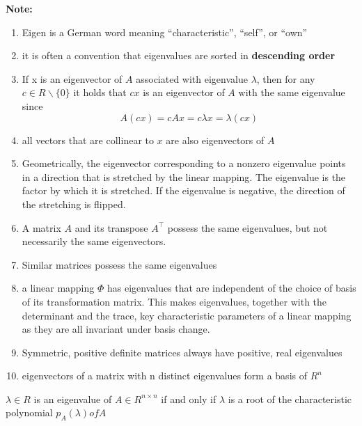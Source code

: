 \noindent\textbf{Note:}
\begin{enumerate}
    \item Eigen is a German word meaning “characteristic”, “self”, or “own”

    \item it is often a convention that eigenvalues are sorted in \textbf{descending order}

    \item If x is an eigenvector of $A$ associated with eigenvalue $\lambda$, then for any $c \in  R\backslash \{0\}$ it holds that $cx$ is an eigenvector of $A$ with the same eigenvalue since 
    \[
        A(cx) = cAx = c\lambda x = \lambda (cx)
    \]

    \item all vectors that are collinear to $x$ are also eigenvectors of $A$

    \item Geometrically, the eigenvector corresponding to a nonzero eigenvalue points in a direction that is stretched by the linear mapping. The eigenvalue is the factor by which it is stretched. If the eigenvalue is negative, the direction of the stretching is flipped.

    \item A matrix $A$ and its transpose $A^\top$  possess the same eigenvalues, but not necessarily the same eigenvectors.

    \item Similar matrices possess the same eigenvalues

    \item a linear mapping $\Phi$ has eigenvalues that are independent of the choice of basis of its transformation matrix. This makes eigenvalues, together with the determinant and the trace, key characteristic parameters of a linear mapping as they are all invariant under basis change.

    \item Symmetric, positive definite matrices always have positive, real eigenvalues

    \item eigenvectors of a matrix with n distinct eigenvalues form a basis of $R^n$

\end{enumerate}

\begin{theorem}
    $\lambda  \in  R$ is an eigenvalue of $A \in  R^{n\times n}$ if and only if $\lambda$  is a root of the characteristic polynomial $p_A(\lambda ) of A$
\end{theorem}

